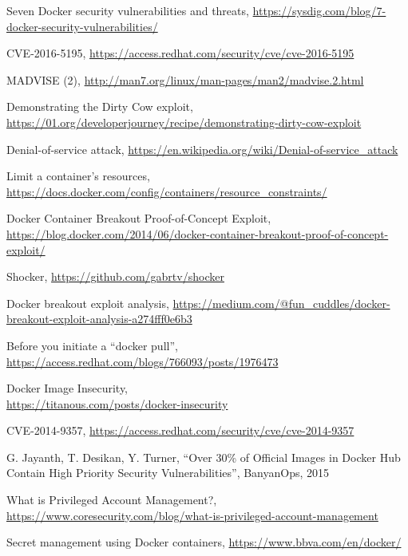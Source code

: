 \documentclass[a4paper,12pt]{article}
\begin{document}
\begin{thebibliography}{99}
Seven Docker security vulnerabilities and threats,
\url{https://sysdig.com/blog/7-docker-security-vulnerabilities/}

CVE-2016-5195, \url{https://access.redhat.com/security/cve/cve-2016-5195} 

MADVISE (2), \url{http://man7.org/linux/man-pages/man2/madvise.2.html}

Demonstrating the Dirty Cow exploit,
\url{https://01.org/developerjourney/recipe/demonstrating-dirty-cow-exploit}

Denial-of-service attack,
\url{https://en.wikipedia.org/wiki/Denial-of-service_attack}

Limit a container's resources,
\url{https://docs.docker.com/config/containers/resource_constraints/}

Docker Container Breakout Proof-of-Concept Exploit,
\url{https://blog.docker.com/2014/06/docker-container-breakout-proof-of-concept-exploit/}

Shocker, \url{https://github.com/gabrtv/shocker}

Docker breakout exploit analysis,
\url{https://medium.com/@fun_cuddles/docker-breakout-exploit-analysis-a274fff0e6b3}

Before you initiate a ``docker pull'',
\url{https://access.redhat.com/blogs/766093/posts/1976473}

Docker Image Insecurity, \\ \url{https://titanous.com/posts/docker-insecurity}

CVE-2014-9357, \url{https://access.redhat.com/security/cve/cve-2014-9357}

G. Jayanth, T. Desikan, Y. Turner, ``Over 30\% of Official Images in Docker Hub
Contain High Priority Security Vulnerabilities'', BanyanOps, 2015

What is Privileged Account Management?,
\url{https://www.coresecurity.com/blog/what-is-privileged-account-management}

Secret management using Docker containers, \url{https://www.bbva.com/en/docker/}


\end{thebibliography}
\end{document}
